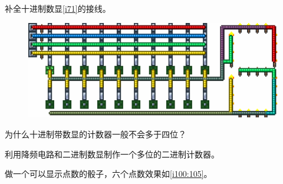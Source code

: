 \begin{problemset}[思考题]
\begin{figure}[!ht]
\begin{center}
{}
\end{center}
\caption{}
\label{i69:70}
\end{figure}
\item 补全十进制数显\autoref{i71}的接线。
\begin{figure}[!ht]
\centering
\includegraphics{images/71.png}
\caption{}
\label{i71}
\end{figure}
\item 为什么十进制带数显的计数器一般不会多于四位？
\item 利用降频电路和二进制数显制作一个多位的二进制计数器。
\item 做一个可以显示点数的骰子，六个点数效果如\autoref{i100:105}。
\begin{figure}[!ht]
\begin{center}
\end{center}
\end{figure}
\end{problemset}
